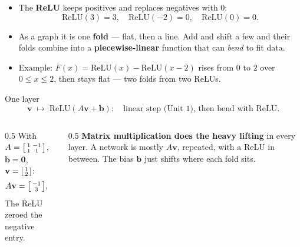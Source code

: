 \documentclass[aspectratio=169, 11pt]{beamer}
\newcommand{\vv}{\mathbf{v}}
\newcommand{\bb}{\mathbf{b}}
\newcommand{\relu}{\mathrm{ReLU}}
\begin{document}
\begin{frame}[t, plain]
  \begin{itemize}
    \setlength{\itemsep}{6pt}
    \item The \textbf{ReLU} keeps positives and replaces negatives with $0$:
          \[ \relu(3)=3,\quad \relu(-2)=0,\quad \relu(0)=0. \]
    \item As a graph it is one \textbf{fold} --- flat, then a line. Add and shift a few and their folds
          combine into a \textbf{piecewise-linear} function that can \emph{bend} to fit data.
    \item Example: $F(x)=\relu(x)-\relu(x-2)$ rises from $0$ to $2$ over $0\le x\le2$, then stays flat ---
          two folds from two ReLUs.
  \end{itemize}
\end{frame}

\begin{frame}[t, plain]
  \begin{block}{One layer}
    \[ \vv \;\longmapsto\; \relu(A\vv+\bb): \quad\text{linear step (Unit 1), then bend with ReLU.} \]
  \end{block}
  \begin{columns}[T]
    \begin{column}{0.5\textwidth}
      With $A=\begin{bsmallmatrix} 1 & -1\\ 1 & 1 \end{bsmallmatrix}$, $\bb=\mathbf{0}$,
      $\vv=\begin{bsmallmatrix} 1\\ 2 \end{bsmallmatrix}$:
      \[ A\vv=\begin{bsmallmatrix} -1\\ 3 \end{bsmallmatrix},\qquad
         \relu(A\vv)=\begin{bsmallmatrix} 0\\ 3 \end{bsmallmatrix}. \]
      The ReLU zeroed the negative entry.
    \end{column}
    \begin{column}{0.5\textwidth}
      \textbf{Matrix multiplication does the heavy lifting} in every layer. A network is mostly $A\vv$,
      repeated, with a ReLU in between. The bias $\bb$ just shifts where each fold sits.
    \end{column}
  \end{columns}
\end{frame}
\end{document}

